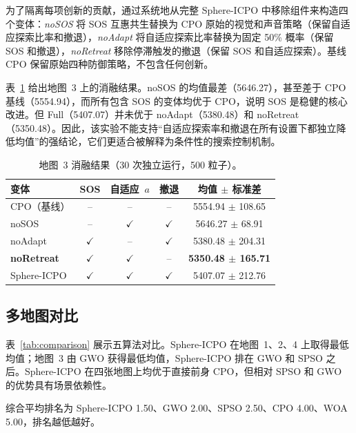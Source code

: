 \documentclass[11pt,a4paper]{ctexart}
\begin{document}
为了隔离每项创新的贡献，通过系统地从完整 Sphere-ICPO 中移除组件来构造四个变体：\textit{noSOS} 将 SOS 互惠共生替换为 CPO 原始的视觉和声音策略（保留自适应探索比率和撤退），\textit{noAdapt} 将自适应探索比率替换为固定 50\% 概率（保留 SOS 和撤退），\textit{noRetreat} 移除停滞触发的撤退（保留 SOS 和自适应探索）。基线 CPO 保留原始四种防御策略，不包含任何创新。

表~\ref{tab:ablation} 给出地图~3 上的消融结果。noSOS 的均值最差（5646.27），甚至差于 CPO 基线（5554.94），而所有包含 SOS 的变体均优于 CPO，说明 SOS 是稳健的核心改进。但 Full（5407.07）并未优于 noAdapt（5380.48）和 noRetreat（5350.48）。因此，该实验不能支持“自适应探索率和撤退在所有设置下都独立降低均值”的强结论，它们更适合被解释为条件性的搜索控制机制。

\begin{table}[h]
\centering
\caption{地图~3 消融结果（30 次独立运行，500 粒子）。}
\label{tab:ablation}
\begin{tabular}{lcccc}
\hline
\textbf{变体} & \textbf{SOS} & \textbf{自适应~$a$} & \textbf{撤退} & \textbf{均值 $\pm$ 标准差} \\
\hline
CPO（基线） & -- & -- & -- & 5554.94 $\pm$ 108.65 \\
noSOS & -- & $\checkmark$ & $\checkmark$ & 5646.27 $\pm$ 68.91 \\
noAdapt & $\checkmark$ & -- & $\checkmark$ & 5380.48 $\pm$ 204.31 \\
\textbf{noRetreat} & $\checkmark$ & $\checkmark$ & -- & \textbf{5350.48 $\pm$ 165.71} \\
Sphere-ICPO & $\checkmark$ & $\checkmark$ & $\checkmark$ & 5407.07 $\pm$ 212.76 \\
\hline
\end{tabular}
\end{table}

\subsection{多地图对比}

表~\ref{tab:comparison} 展示五算法对比。Sphere-ICPO 在地图~1、2、4 上取得最低均值；地图~3 由 GWO 获得最低均值，Sphere-ICPO 排在 GWO 和 SPSO 之后。Sphere-ICPO 在四张地图上均优于直接前身 CPO，但相对 SPSO 和 GWO 的优势具有场景依赖性。

综合平均排名为 Sphere-ICPO 1.50、GWO 2.00、SPSO 2.50、CPO 4.00、WOA 5.00，排名越低越好。
\end{document}

